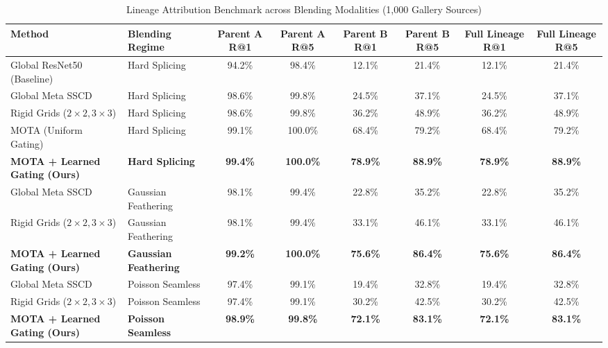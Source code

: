 \documentclass[journal]{IEEEtran}
\begin{document}
\begin{table}[t]
\centering
\caption{Lineage Attribution Benchmark across Blending Modalities (1,000 Gallery Sources)}
\label{tab:main_benchmark}
\begin{tabular}{llcccccc}
\toprule
\textbf{Method} & \textbf{Blending Regime} & \textbf{Parent A R@1} & \textbf{Parent A R@5} & \textbf{Parent B R@1} & \textbf{Parent B R@5} & \textbf{Full Lineage R@1} & \textbf{Full Lineage R@5} \\
\midrule
Global ResNet50 (Baseline) & Hard Splicing & 94.2\% & 98.4\% & 12.1\% & 21.4\% & 12.1\% & 21.4\% \\
Global Meta SSCD~\cite{Pizzi2022SSCD} & Hard Splicing & 98.6\% & 99.8\% & 24.5\% & 37.1\% & 24.5\% & 37.1\% \\
Rigid Grids ($2\times 2, 3\times 3$) & Hard Splicing & 98.6\% & 99.8\% & 36.2\% & 48.9\% & 36.2\% & 48.9\% \\
MOTA (Uniform Gating) & Hard Splicing & 99.1\% & 100.0\% & 68.4\% & 79.2\% & 68.4\% & 79.2\% \\
\textbf{MOTA + Learned Gating (Ours)} & \textbf{Hard Splicing} & \textbf{99.4\%} & \textbf{100.0\%} & \textbf{78.9\%} & \textbf{88.9\%} & \textbf{78.9\%} & \textbf{88.9\%} \\
\midrule
Global Meta SSCD~\cite{Pizzi2022SSCD} & Gaussian Feathering & 98.1\% & 99.4\% & 22.8\% & 35.2\% & 22.8\% & 35.2\% \\
Rigid Grids ($2\times 2, 3\times 3$) & Gaussian Feathering & 98.1\% & 99.4\% & 33.1\% & 46.1\% & 33.1\% & 46.1\% \\
\textbf{MOTA + Learned Gating (Ours)} & \textbf{Gaussian Feathering} & \textbf{99.2\%} & \textbf{100.0\%} & \textbf{75.6\%} & \textbf{86.4\%} & \textbf{75.6\%} & \textbf{86.4\%} \\
\midrule
Global Meta SSCD~\cite{Pizzi2022SSCD} & Poisson Seamless & 97.4\% & 99.1\% & 19.4\% & 32.8\% & 19.4\% & 32.8\% \\
Rigid Grids ($2\times 2, 3\times 3$) & Poisson Seamless & 97.4\% & 99.1\% & 30.2\% & 42.5\% & 30.2\% & 42.5\% \\
\textbf{MOTA + Learned Gating (Ours)} & \textbf{Poisson Seamless} & \textbf{98.9\%} & \textbf{99.8\%} & \textbf{72.1\%} & \textbf{83.1\%} & \textbf{72.1\%} & \textbf{83.1\%} \\
\bottomrule
\end{tabular}
\end{table}
\end{document}
